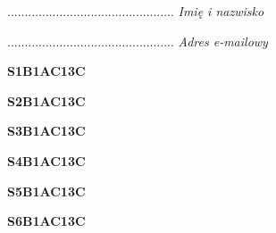 \begin{turn}{90}\begin{minipage}{\linewidth} \vspace{20mm} ................................................  \textit{Imię i nazwisko}\end{minipage}\end{turn}

\begin{turn}{90}\begin{minipage}{\linewidth} \vspace{20mm} ................................................  \textit{Adres e-mailowy}\end{minipage}\end{turn}

\begin{turn}{90}\huge \begin{minipage}{\linewidth} \vspace{10mm}\textbf{S1B1AC13C}\end{minipage}\end{turn}

\begin{turn}{90}\huge \begin{minipage}{\linewidth} \vspace{10mm}\textbf{S2B1AC13C}\end{minipage}\end{turn}

\begin{turn}{90}\huge \begin{minipage}{\linewidth} \vspace{10mm}\textbf{S3B1AC13C}\end{minipage}\end{turn}

\begin{turn}{90}\huge \begin{minipage}{\linewidth} \vspace{10mm}\textbf{S4B1AC13C}\end{minipage}\end{turn}

\begin{turn}{90}\huge \begin{minipage}{\linewidth} \vspace{10mm}\textbf{S5B1AC13C}\end{minipage}\end{turn}

\begin{turn}{90}\huge \begin{minipage}{\linewidth} \vspace{10mm}\textbf{S6B1AC13C}\end{minipage}\end{turn}


